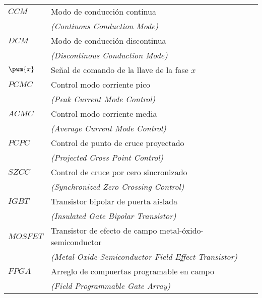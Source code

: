 {
\renewcommand{\arraystretch}{0.8}
\begin{longtable}[l]{p{100pt} p{300pt}}
  $CCM$ & Modo de conducción continua \\
  & \textit{(Continous Conduction Mode)} \\
  $DCM$ & Modo de conducción discontinua \\
  & \textit{(Discontinous Conduction Mode)} \\
  $\pwm{x}$ & Señal de comando de la llave de la fase $x$ \\
  $PCMC$ & Control modo corriente pico \\
  & \textit{(Peak Current Mode Control)}\\
  $ACMC$ & Control modo corriente media \\
  & \textit{(Average Current Mode Control)}\\
  $PCPC$ & Control de punto de cruce proyectado \\
  & \textit{(Projected Cross Point Control)}\\    
  $SZCC$ & Control de cruce por cero sincronizado \\
  & \textit{(Synchronized Zero Crossing Control)} \\
  $IGBT$ & Transistor bipolar de puerta aislada \\
  & \textit{(Insulated Gate Bipolar Transistor)} \\
  $MOSFET$ & Transistor de efecto de campo metal-óxido-semiconductor \\ & \textit{(Metal-Oxide-Semiconductor Field-Effect Transistor)} \\
  $FPGA$ & Arreglo de compuertas programable en campo \\
  & \textit{(Field Programmable Gate Array)}
  

\end{longtable}}
